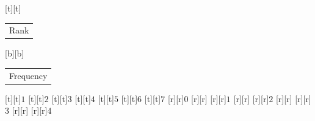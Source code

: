 %    
%
%
\begin{psfrags}%
\psfragscanon%
%
[t][t]{\color[rgb]{0,0,0}\setlength{\tabcolsep}{0pt}\begin{tabular}{c}\Large{}Rank\end{tabular}}%
[b][b]{\color[rgb]{0,0,0}\setlength{\tabcolsep}{0pt}\begin{tabular}{c}\Large{}Frequency\end{tabular}}%
%
[t][t]{$1$}%
[t][t]{$2$}%
[t][t]{$3$}%
[t][t]{$4$}%
[t][t]{$5$}%
[t][t]{$6$}%
[t][t]{$7$}%
%
[r][r]{$0$}%
[r][r]{}%
[r][r]{$1$}%
[r][r]{}%
[r][r]{$2$}%
[r][r]{}%
[r][r]{$3$}%
[r][r]{}%
[r][r]{$4$}%
%
%
\end{psfrags}%
%
